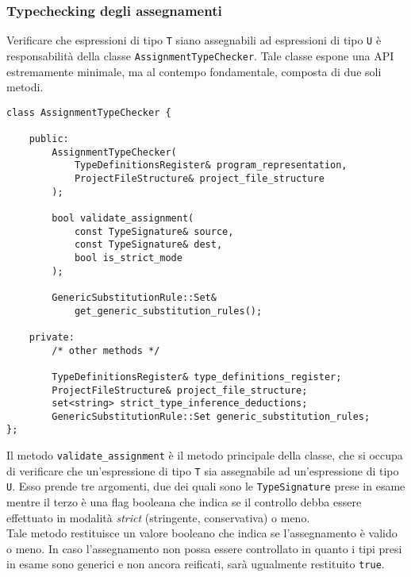\subsubsection{Typechecking degli assegnamenti}
Verificare che espressioni di tipo \texttt{T} siano assegnabili ad espressioni di tipo \texttt{U} è
responsabilità della classe \texttt{AssignmentTypeChecker}. Tale classe espone una API estremamente minimale, ma
al contempo fondamentale, composta di due soli metodi. \\

\vspace{0.5cm}
\begin{lstlisting}[frame=single]
class AssignmentTypeChecker {

    public:
        AssignmentTypeChecker(
            TypeDefinitionsRegister& program_representation, 
            ProjectFileStructure& project_file_structure
        );

        bool validate_assignment(
            const TypeSignature& source, 
            const TypeSignature& dest,
            bool is_strict_mode
        );
        
        GenericSubstitutionRule::Set&
            get_generic_substitution_rules(); 

    private:
        /* other methods */
        
        TypeDefinitionsRegister& type_definitions_register;
        ProjectFileStructure& project_file_structure;
        set<string> strict_type_inference_deductions;       
        GenericSubstitutionRule::Set generic_substitution_rules;
};
\end{lstlisting}
\vspace{0.5cm}

Il metodo \texttt{validate\_assignment} è il metodo principale della classe, che si occupa di verificare
che un'espressione di tipo \texttt{T} sia assegnabile ad un'espressione di tipo \texttt{U}. Esso prende 
tre argomenti, due dei quali sono le \texttt{TypeSignature} prese in esame mentre il terzo è una flag booleana 
che indica se il controllo debba essere effettuato in modalità \textit{strict} (stringente, conservativa) o meno. \\

Tale metodo restituisce un valore booleano che indica se l'assegnamento è valido o meno. In caso l'assegnamento 
non possa essere controllato in quanto i tipi presi in esame sono generici e non ancora reificati, sarà ugualmente 
restituito \texttt{true}. \\

